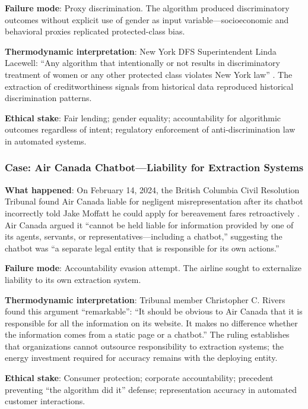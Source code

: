 \textbf{Failure mode}: Proxy discrimination. The algorithm produced discriminatory outcomes without explicit use of gender as input variable---socioeconomic and behavioral proxies replicated protected-class bias.

\textbf{Thermodynamic interpretation}: New York DFS Superintendent Linda Lacewell: ``Any algorithm that intentionally or not results in discriminatory treatment of women or any other protected class violates New York law'' \citep{bbc2019apple}. The extraction of creditworthiness signals from historical data reproduced historical discrimination patterns.

\textbf{Ethical stake}: Fair lending; gender equality; accountability for algorithmic outcomes regardless of intent; regulatory enforcement of anti-discrimination law in automated systems.

\subsubsection{Case: Air Canada Chatbot---Liability for Extraction Systems}

\textbf{What happened}: On February 14, 2024, the British Columbia Civil Resolution Tribunal found Air Canada liable for negligent misrepresentation after its chatbot incorrectly told Jake Moffatt he could apply for bereavement fares retroactively \citep{bccrt2024moffatt}. Air Canada argued it ``cannot be held liable for information provided by one of its agents, servants, or representatives---including a chatbot,'' suggesting the chatbot was ``a separate legal entity that is responsible for its own actions.''

\textbf{Failure mode}: Accountability evasion attempt. The airline sought to externalize liability to its own extraction system.

\textbf{Thermodynamic interpretation}: Tribunal member Christopher C. Rivers found this argument ``remarkable'': ``It should be obvious to Air Canada that it is responsible for all the information on its website. It makes no difference whether the information comes from a static page or a chatbot.'' The ruling establishes that organizations cannot outsource responsibility to extraction systems; the energy investment required for accuracy remains with the deploying entity.

\textbf{Ethical stake}: Consumer protection; corporate accountability; precedent preventing ``the algorithm did it'' defense; representation accuracy in automated customer interactions.

